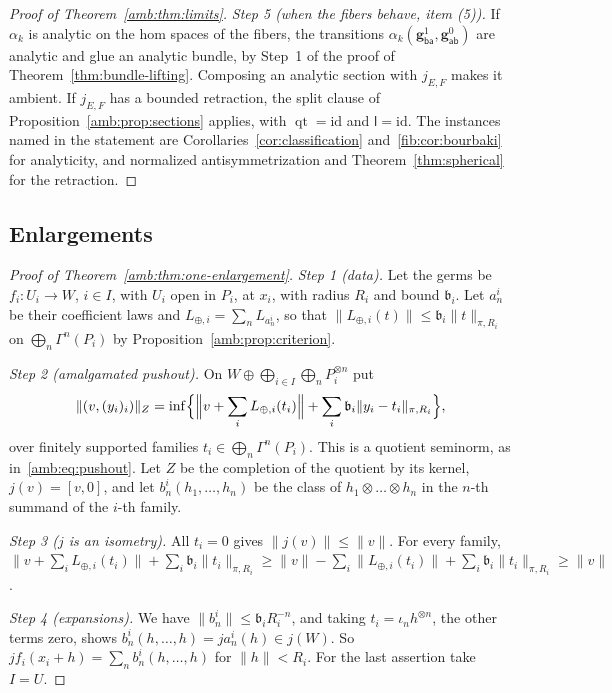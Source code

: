 \documentclass[11pt]{amsart}
\theoremstyle{definition}
\theoremstyle{remark}
\numberwithin{equation}{section}
\newcommand{\id}{\mathrm{id}}
\newcommand{\norm}[1]{\lVert #1\rVert}
\theoremstyle{plain}
\theoremstyle{definition}
\theoremstyle{plain}
\begin{document}
\begin{proof}[Proof of Theorem~\ref{amb:thm:limits}]
\emph{Step 5 (when the fibers behave, item (5)).} If $\alpha_k$ is analytic on the hom spaces of the fibers, the transitions $\alpha_k(\mathbf g^1_{\mathsf{ba}},\mathbf g^0_{\mathsf{ab}})$ are analytic and glue an analytic bundle, by Step~1 of the proof of Theorem~\ref{thm:bundle-lifting}. Composing an analytic section with $j_{E,F}$ makes it ambient. If $j_{E,F}$ has a bounded retraction, the split clause of Proposition~\ref{amb:prop:sections} applies, with $\operatorname{qt}=\id$ and $\mathsf l=\id$. The instances named in the statement are Corollaries~\ref{cor:classification} and~\ref{fib:cor:bourbaki} for analyticity, and normalized antisymmetrization and Theorem~\ref{thm:spherical} for the retraction.
\end{proof}

\subsection{Enlargements}\label{amb:ssec:proofs-aa}

\begin{proof}[Proof of Theorem~\ref{amb:thm:one-enlargement}]
\emph{Step 1 (data).} Let the germs be $f_i\colon U_i\to W$, $i\in I$, with $U_i$ open in $P_i$, at $x_i$, with radius $R_i$ and bound $\mathfrak b_i$. Let $a^i_n$ be their coefficient laws and $L_{\oplus,i}=\sum_nL_{a^i_n}$, so that $\norm{L_{\oplus,i}(t)}\le \mathfrak b_i\norm t_{\pi,R_i}$ on $\bigoplus_n\Gamma^n(P_i)$ by Proposition~\ref{amb:prop:criterion}.

\emph{Step 2 (amalgamated pushout).} On $W\oplus\bigoplus_{i\in I}\bigoplus_nP_i^{\otimes n}$ put
\[
 \norm{(v,(y_i)_i)}_Z=\inf\Bigl\{\Bigl\lVert v+\sum_iL_{\oplus,i}(t_i)\Bigr\rVert+\sum_i\mathfrak b_i\norm{y_i-t_i}_{\pi,R_i}\Bigr\},
\]
over finitely supported families $t_i\in\bigoplus_n\Gamma^n(P_i)$. This is a quotient seminorm, as in~\eqref{amb:eq:pushout}. Let $Z$ be the completion of the quotient by its kernel, $j(v)=[v,0]$, and let $b^i_n(h_1,\dots,h_n)$ be the class of $h_1\otimes\dots\otimes h_n$ in the $n$\nobreakdash-th summand of the $i$\nobreakdash-th family.

\emph{Step 3 ($j$ is an isometry).} All $t_i=0$ gives $\norm{j(v)}\le\norm v$. For every family, $\norm{v+\sum_iL_{\oplus,i}(t_i)}+\sum_i\mathfrak b_i\norm{t_i}_{\pi,R_i}\ge\norm v-\sum_i\norm{L_{\oplus,i}(t_i)}+\sum_i\mathfrak b_i\norm{t_i}_{\pi,R_i}\ge\norm v$.

\emph{Step 4 (expansions).} We have $\norm{b^i_n}\le \mathfrak b_iR_i^{-n}$, and taking $t_i=\iota_nh^{\otimes n}$, the other terms zero, shows $b^i_n(h,\dots,h)=ja^i_n(h)\in j(W)$. So $jf_i(x_i+h)=\sum_nb^i_n(h,\dots,h)$ for $\norm h<R_i$. For the last assertion take $I=U$.
\end{proof}
\end{document}
